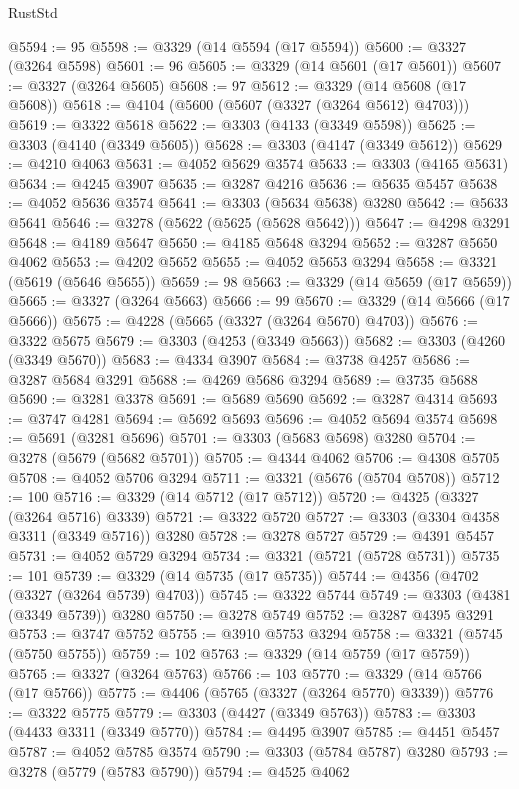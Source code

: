 \begin{lexlean}{RustStd}
\begin{coremodule}
@5594 := 95
@5598 := @3329 (@14 @5594 (@17 @5594))
@5600 := @3327 (@3264 @5598)
@5601 := 96
@5605 := @3329 (@14 @5601 (@17 @5601))
@5607 := @3327 (@3264 @5605)
@5608 := 97
@5612 := @3329 (@14 @5608 (@17 @5608))
@5618 := @4104 (@5600 (@5607 (@3327 (@3264 @5612) @4703)))
@5619 := @3322 @5618
@5622 := @3303 (@4133 (@3349 @5598))
@5625 := @3303 (@4140 (@3349 @5605))
@5628 := @3303 (@4147 (@3349 @5612))
@5629 := @4210 @4063
@5631 := @4052 @5629 @3574
@5633 := @3303 (@4165 @5631)
@5634 := @4245 @3907
@5635 := @3287 @4216
@5636 := @5635 @5457
@5638 := @4052 @5636 @3574
@5641 := @3303 (@5634 @5638) @3280
@5642 := @5633 @5641
@5646 := @3278 (@5622 (@5625 (@5628 @5642)))
@5647 := @4298 @3291
@5648 := @4189 @5647
@5650 := @4185 @5648 @3294
@5652 := @3287 @5650 @4062
@5653 := @4202 @5652
@5655 := @4052 @5653 @3294
@5658 := @3321 (@5619 (@5646 @5655))
@5659 := 98
@5663 := @3329 (@14 @5659 (@17 @5659))
@5665 := @3327 (@3264 @5663)
@5666 := 99
@5670 := @3329 (@14 @5666 (@17 @5666))
@5675 := @4228 (@5665 (@3327 (@3264 @5670) @4703))
@5676 := @3322 @5675
@5679 := @3303 (@4253 (@3349 @5663))
@5682 := @3303 (@4260 (@3349 @5670))
@5683 := @4334 @3907
@5684 := @3738 @4257
@5686 := @3287 @5684 @3291
@5688 := @4269 @5686 @3294
@5689 := @3735 @5688
@5690 := @3281 @3378
@5691 := @5689 @5690
@5692 := @3287 @4314
@5693 := @3747 @4281
@5694 := @5692 @5693
@5696 := @4052 @5694 @3574
@5698 := @5691 (@3281 @5696)
@5701 := @3303 (@5683 @5698) @3280
@5704 := @3278 (@5679 (@5682 @5701))
@5705 := @4344 @4062
@5706 := @4308 @5705
@5708 := @4052 @5706 @3294
@5711 := @3321 (@5676 (@5704 @5708))
@5712 := 100
@5716 := @3329 (@14 @5712 (@17 @5712))
@5720 := @4325 (@3327 (@3264 @5716) @3339)
@5721 := @3322 @5720
@5727 := @3303 (@3304 @4358 @3311 (@3349 @5716)) @3280
@5728 := @3278 @5727
@5729 := @4391 @5457
@5731 := @4052 @5729 @3294
@5734 := @3321 (@5721 (@5728 @5731))
@5735 := 101
@5739 := @3329 (@14 @5735 (@17 @5735))
@5744 := @4356 (@4702 (@3327 (@3264 @5739) @4703))
@5745 := @3322 @5744
@5749 := @3303 (@4381 (@3349 @5739)) @3280
@5750 := @3278 @5749
@5752 := @3287 @4395 @3291
@5753 := @3747 @5752
@5755 := @3910 @5753 @3294
@5758 := @3321 (@5745 (@5750 @5755))
@5759 := 102
@5763 := @3329 (@14 @5759 (@17 @5759))
@5765 := @3327 (@3264 @5763)
@5766 := 103
@5770 := @3329 (@14 @5766 (@17 @5766))
@5775 := @4406 (@5765 (@3327 (@3264 @5770) @3339))
@5776 := @3322 @5775
@5779 := @3303 (@4427 (@3349 @5763))
@5783 := @3303 (@4433 @3311 (@3349 @5770))
@5784 := @4495 @3907
@5785 := @4451 @5457
@5787 := @4052 @5785 @3574
@5790 := @3303 (@5784 @5787) @3280
@5793 := @3278 (@5779 (@5783 @5790))
@5794 := @4525 @4062

\end{coremodule}
\end{lexlean}
